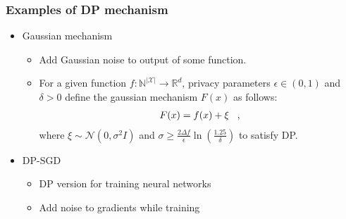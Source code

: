 \begin{frame}
    \frametitle{Examples of DP mechanism}

    \begin{itemize}
        \item Gaussian mechanism
        \begin{itemize}
            \item Add \alert{Gaussian noise} to output of some function.
            \item For a given function  $f:\mathbb{N}^{|\mathcal{X}|} \longrightarrow \mathbb{R}^d$, privacy parameters $\epsilon \in (0,1)$ and $\delta>0$ define the gaussian mechanism $F(x)$ as follows:
            \begin{align}
                F(x) = f(x) + \xi \;\;\;,
            \end{align}
            where $\xi \sim  \mathcal{N}(0, \sigma^2 I)$ and $\sigma \ge \frac{2 \Delta f}{\epsilon}\ln(\frac{1.25}{\delta})$ to satisfy DP.
        \end{itemize}
        \item DP-SGD
        \begin{itemize}
            \item DP version for training neural networks
            \item \alert{Add noise to gradients} while training
        \end{itemize}
    \end{itemize}
    

\end{frame}



